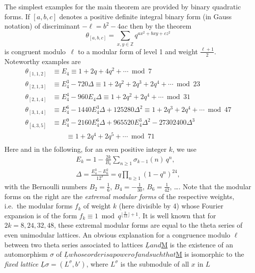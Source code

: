 \documentclass[12pt, a4paper, draft]{article}
\theoremstyle{plain}
\newtheorem*{Main Theorem}{Main Theorem}
\begin{document}
The simplest examples for the main theorem are provided by binary
quadratic forms.  If $[a,b,c]$ denotes a positive definite integral
binary form (in Gauss notation) of discriminant $-\ell = b^2-4ac$ then
by the theorem
\[
\theta_{[a,b,c]} = \sum_{x,y\in{{\mathbb Z}}} q^{ax^2+bxy+cz^2}
\]
is congruent modulo~$\ell$ to a modular form of level 1 and weight
$\frac{\ell +1}2$. Noteworthy examples are
\begin{align*}
  \theta_{[1,1,2]} &\equiv E_4
  \equiv 1 + 2q + 4q^{2} + \cdots \bmod 7\\
  \theta_{[2,1,3]} &\equiv E_4^3-720 \Delta
  \equiv 1 + 2q^{2} + 2q^{3} + 2q^{4} + \cdots   \bmod 23\\
  \theta_{[2,1,4]} &\equiv E_4^4-960 E_4 \Delta
  \equiv 1 + 2q^{2} + 2q^{4} + \cdots   \bmod 31\\
  \theta_{[3,1,4]} &\equiv E_4^6-1440 E_4^3 \Delta+125280 \Delta^2
  \equiv 1 + 2q^{3} + 2q^{4} + \cdots   \bmod 47\\
  \theta_{[4,3,5]} &\equiv E_4^9-2160 E_4^6 \Delta+965520 E_4^3
  \Delta^2-27302400 \Delta^3
  \\&\qquad \equiv 1 + 2q^{4} + 2q^{5} + \cdots  \bmod 71\\
  
  
\end{align*}
Here and in the following, for an even positive integer $k$, we use
\begin{gather*}
  E_k = 1 - \frac {2k}{B_{k}}\sum_{n\ge 1}\sigma_{k-1}(n)\,q^n,\\
  \Delta = \frac {E_4^3-E_6^2}{12^3} = q\prod_{n\ge 1}(1-q^n)^{24} ,
\end{gather*}
with the Bernoulli numbers $B_2=\frac16$, $B_4=-\frac 1{30}$,
$B_6=\frac 1{42}$, \dots.  Note that the modular forms on the right
are the {\it extremal modular forms} of the respective weights,
i.e.~the modular forms $f_k$ of weight $k$ (here divisible by 4) whose
Fourier expansion is of the form $f_k \equiv 1 \bmod q^{\lfloor\frac
  k{12}\rfloor+1}$.  It is well known that for $2k=8,24,32,48$, these
extremal modular forms are equal to the theta series of even
unimodular lattices.  An obvious explanation for a congruence modulo
$\ell$ between two theta series associated to lattices ${\underline{L}} and
${\underline{M}} is the existence of an automorphism $\sigma$ of ${\underline{L}}
whose order is a power of $\ell$ and such that ${\underline{M}} is
isomorphic to the {\it fixed lattice} ${\underline{L}}\sigma = {\left({L^\sigma},{b'}\right)}$, where $L^\sigma$ is the submodule of all $x$ in $L$
\end{document}
